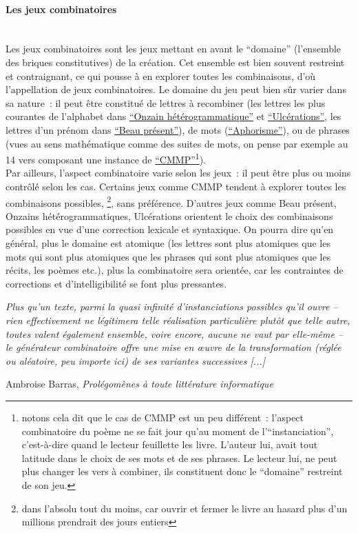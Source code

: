\documentclass{article}
\newcommand{\subsubsubsection}[1]{\paragraph{#1}\mbox{}\\}
\newenvironment{citationbox}
{\begin{center}
		\begin{minipage}{.8\textwidth}
		}
		{
		\end{minipage}	
\end{center}
}
\begin{document}
				\subsubsubsection{Les jeux combinatoires}
					Les jeux combinatoires sont les jeux mettant en avant le ``domaine'' (l'ensemble des briques constitutives) de la création. Cet ensemble est bien souvent restreint et contraignant, ce qui pousse à en explorer toutes les combinaisons, d'où l'appellation de jeux combinatoires. Le domaine du jeu peut bien sûr varier dans sa nature~: il peut être constitué de lettres à recombiner (les lettres les plus courantes de l'alphabet dans \href{http://oulipo.net/fr/contraintes/onzain-heterogrammatique}{``Onzain hétérogrammatique''} et \href{http://oulipo.net/fr/contraintes/ulcerations}{``Ulcérations''}, les lettres d'un prénom dans \href{http://oulipo.net/fr/contraintes/beau-present}{``Beau présent''}), de mots (\href{http://oulipo.net/fr/contraintes/aphorisme}{``Aphorisme''}), ou de phrases (vues au sens mathématique comme des suites de mots, on pense par exemple au 14 vers composant une instance de \href{http://oulipo.net/fr/contraintes/cmmp}{``CMMP''}\footnote{notons cela dit que le cas de CMMP est un peu différent~: l'aspect combinatoire du poème ne se fait jour qu'au moment de l'``instanciation'', c'est-à-dire quand le lecteur feuillette les livre. L'auteur lui, avait tout latitude dans le choix de ses mots et de ses phrases. Le lecteur lui, ne peut plus changer les vers à combiner, ils constituent donc le ``domaine'' restreint de son jeu.}).\\
				
					Par ailleurs, l'aspect combinatoire varie selon les jeux~: il peut être plus ou moins contrôlé selon les cas. Certains jeux comme CMMP tendent à explorer toutes les combinaisons possibles, \footnote{dans l'absolu tout du moins, car ouvrir et fermer le livre au hasard plus d'un millions prendrait des jours entiers}, sans préférence. D'autres jeux comme Beau présent, Onzains hétérogrammatiques, Ulcérations orientent le choix des combinaisons possibles en vue d'une correction lexicale et syntaxique. On pourra dire qu'en général, plus le domaine est atomique (les lettres sont plus atomiques que les mots qui sont plus atomiques que les phrases qui sont plus atomiques que les récits, les poèmes etc.), plus la combinatoire sera orientée, car les contraintes de corrections et d'intelligibilité se font plus pressantes.\\
				
					
					\begin{citationbox}
						\textit{Plus qu'un texte, parmi la quasi infinité d'instanciations possibles qu'il ouvre -- rien effectivement ne
					légitimera telle réalisation particulière plutôt que telle autre, toutes valent
					également ensemble, voire encore, aucune ne vaut par elle-même -- le
					générateur combinatoire offre une mise en œuvre de la transformation
					(réglée ou aléatoire, peu importe ici) de ses variantes successives [...]}
					\begin{flushright}
						Ambroise Barras, \textit{Prolégomènes à toute littérature informatique} \cite{barras1995}
					\end{flushright}
					\end{citationbox}
				
\end{document}
